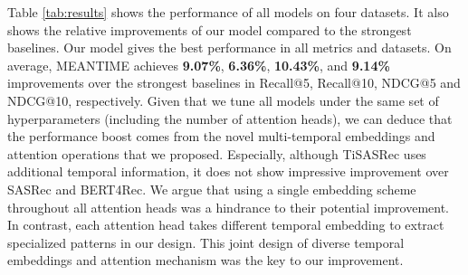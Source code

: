 Table \ref{tab:results} shows the performance of all models on four datasets. It also shows the relative improvements of our model compared to the strongest baselines.
Our model gives the best performance in all metrics and datasets. On average, MEANTIME achieves \textbf{9.07\%}, \textbf{6.36\%}, \textbf{10.43\%}, and \textbf{9.14\%} improvements over the strongest baselines in Recall@5, Recall@10, NDCG@5 and NDCG@10, respectively. Given that we tune all models under the same set of hyperparameters (including the number of attention heads), we can deduce that the performance boost comes from the novel multi-temporal embeddings and attention operations that we proposed. Especially, although TiSASRec uses additional temporal information, it does not show impressive improvement over SASRec and BERT4Rec. We argue that using a single embedding scheme throughout all attention heads was a hindrance to their potential improvement. In contrast, each attention head takes different temporal embedding to extract specialized patterns in our design. This joint design of diverse temporal embeddings and attention mechanism was the key to our improvement.
